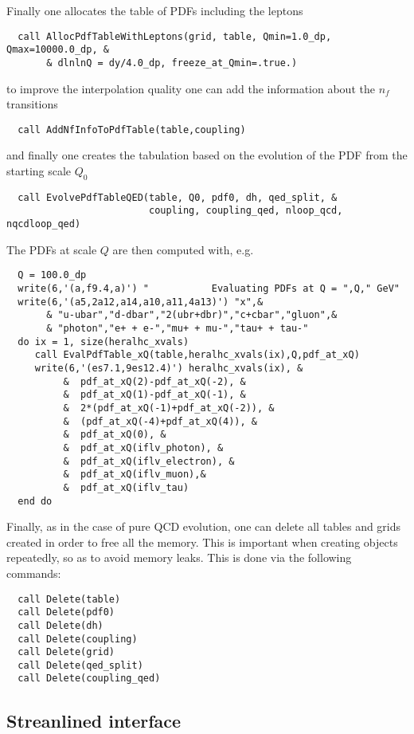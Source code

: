 \documentclass[12pt]{article}
\begin{document}
Finally one allocates the table of PDFs including the leptons
\begin{lstlisting}
  call AllocPdfTableWithLeptons(grid, table, Qmin=1.0_dp, Qmax=10000.0_dp, & 
       & dlnlnQ = dy/4.0_dp, freeze_at_Qmin=.true.)
\end{lstlisting}
to improve the interpolation quality one can add the information about
the $n_f$ transitions
\begin{lstlisting}
  call AddNfInfoToPdfTable(table,coupling)
\end{lstlisting}
and finally one creates the tabulation based on the evolution of the PDF from the starting scale $Q_0$ 
\begin{lstlisting}
  call EvolvePdfTableQED(table, Q0, pdf0, dh, qed_split, &
                         coupling, coupling_qed, nloop_qcd, nqcdloop_qed)
\end{lstlisting}

The PDFs at scale $Q$ are then computed with, e.g. 
\begin{lstlisting}
  Q = 100.0_dp
  write(6,'(a,f9.4,a)') "           Evaluating PDFs at Q = ",Q," GeV"
  write(6,'(a5,2a12,a14,a10,a11,4a13)') "x",&
       & "u-ubar","d-dbar","2(ubr+dbr)","c+cbar","gluon",&
       & "photon","e+ + e-","mu+ + mu-","tau+ + tau-"
  do ix = 1, size(heralhc_xvals)
     call EvalPdfTable_xQ(table,heralhc_xvals(ix),Q,pdf_at_xQ)
     write(6,'(es7.1,9es12.4)') heralhc_xvals(ix), &
          &  pdf_at_xQ(2)-pdf_at_xQ(-2), &
          &  pdf_at_xQ(1)-pdf_at_xQ(-1), &
          &  2*(pdf_at_xQ(-1)+pdf_at_xQ(-2)), &
          &  (pdf_at_xQ(-4)+pdf_at_xQ(4)), &
          &  pdf_at_xQ(0), &
          &  pdf_at_xQ(iflv_photon), &
          &  pdf_at_xQ(iflv_electron), &
          &  pdf_at_xQ(iflv_muon),&
          &  pdf_at_xQ(iflv_tau)          
  end do
\end{lstlisting}

Finally, as in the case of pure QCD evolution, one can delete all
tables and grids created in order to free all the memory.  This is
important when creating objects repeatedly, so as to avoid memory
leaks.
%
This is done via the following commands: 
\begin{lstlisting}
  call Delete(table)
  call Delete(pdf0)
  call Delete(dh)
  call Delete(coupling)
  call Delete(grid)
  call Delete(qed_split)
  call Delete(coupling_qed)
\end{lstlisting}

\subsection{Streanlined interface}
\end{document}
